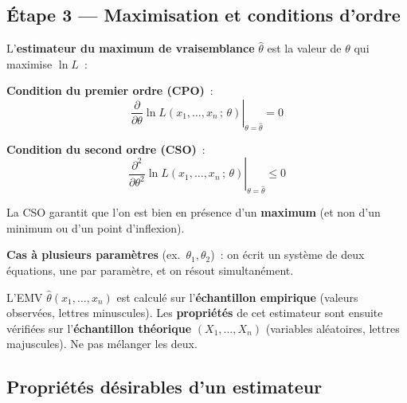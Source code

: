 \documentclass[11pt,a4paper]{article}
\begin{document}
\subsection{\'Etape 3 --- Maximisation et conditions d'ordre}

\begin{thmbox}
L'\textbf{estimateur du maximum de vraisemblance} $\hat\theta$ est la valeur de $\theta$ qui maximise $\ln L$~:

\medskip
\textbf{Condition du premier ordre (CPO)}~:
$$\left.\frac{\partial}{\partial\theta}\ln L(x_1,\ldots,x_n\,;\,\theta)\right|_{\theta=\hat\theta} = 0$$

\textbf{Condition du second ordre (CSO)}~:
$$\left.\frac{\partial^2}{\partial\theta^2}\ln L(x_1,\ldots,x_n\,;\,\theta)\right|_{\theta=\hat\theta} \leq 0$$

La CSO garantit que l'on est bien en pr\'esence d'un \textbf{maximum} (et non d'un minimum ou d'un point d'inflexion).

\medskip
\textbf{Cas \`a plusieurs param\`etres} (ex.~$\theta_1,\theta_2$)~: on \'ecrit un syst\`eme de deux \'equations, une par param\`etre, et on r\'esout simultan\'ement.
\end{thmbox}

\begin{alertbox}
L'EMV $\hat\theta(x_1,\ldots,x_n)$ est calcul\'e sur l'\textbf{\'echantillon empirique} (valeurs observ\'ees, lettres minuscules). Les \textbf{propri\'et\'es} de cet estimateur sont ensuite v\'erifi\'ees sur l'\textbf{\'echantillon th\'eorique} $(X_1,\ldots,X_n)$ (variables al\'eatoires, lettres majuscules). Ne pas m\'elanger les deux.
\end{alertbox}

\subsection{Propri\'et\'es d\'esirables d'un estimateur}
\end{document}
